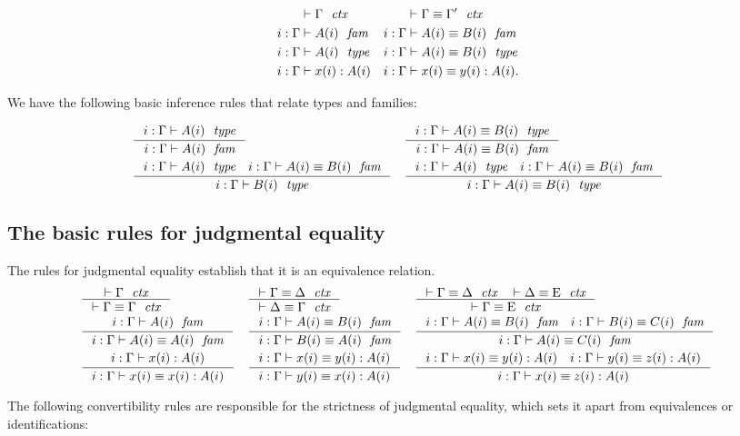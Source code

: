\begin{align*}
\jvctx*{\Gamma} & \jvctxeq*{\Gamma}{\Gamma'}\\
\jvfam*{i}{\Gamma}{A} & \jvfameq*{i}{\Gamma}{A}{B}\\
\jvtype*{i}{\Gamma}{A} & \jvtypeeq*{i}{\Gamma}{A}{B}\\
\jvterm*{i}{\Gamma}{A}{x} & \jvtermeq*{i}{\Gamma}{A}{x}{y}.
\end{align*}

We have the following basic inference rules that relate types and families:

\begin{small}
\begin{align*}
& \inference
  {\jvtype{i}{\Gamma}{A}}
  {\jvfam{i}{\Gamma}{A}}
& & \inference
    {\jvtypeeq{i}{\Gamma}{A}{B}}
    {\jvfameq{i}{\Gamma}{A}{B}}\\
& \inference
  {\jvtype{i}{\Gamma}{A}
   \jvfameq{i}{\Gamma}{A}{B}}
  {\jvtype{i}{\Gamma}{B}}
& & \inference
    {\jvtype{i}{\Gamma}{A}
     \jvfameq{i}{\Gamma}{A}{B}}
    {\jvtypeeq{i}{\Gamma}{A}{B}}
\end{align*}
\end{small}

\subsection{The basic rules for judgmental equality}
The rules for judgmental equality establish that it is an equivalence relation.
\bgroup\small
\begin{align*}
& \inference
  {\jvctx{\Gamma}}
  {\jvctxeq{\Gamma}{\Gamma}} 
& & \inference
    {\jvctxeq{\Gamma}{\Delta}}
    {\jvctxeq{\Delta}{\Gamma}} 
& & \inference
    {\jvctxeq{\Gamma}{\Delta}
     \jvctxeq{\Delta}{\greek{E}}}
    {\jvctxeq{\Gamma}{\greek{E}}}\\
& \inference
  {\jvfam{i}{\Gamma}{A}}
  {\jvfameq{i}{\Gamma}{A}{A}} 
& & \inference
    {\jvfameq{i}{\Gamma}{A}{B}}
    {\jvfameq{i}{\Gamma}{B}{A}}
& & \inference
    {\jvfameq{i}{\Gamma}{A}{B}
     \jvfameq{i}{\Gamma}{B}{C}}
    {\jvfameq{i}{\Gamma}{A}{C}}\\
& \inference
  {\jvterm{i}{\Gamma}{A}{x}}
  {\jvtermeq{i}{\Gamma}{A}{x}{x}}
& & \inference
    {\jvtermeq{i}{\Gamma}{A}{x}{y}}
    {\jvtermeq{i}{\Gamma}{A}{y}{x}}
& & \inference
    {\jvtermeq{i}{\Gamma}{A}{x}{y}
     \jvtermeq{i}{\Gamma}{A}{y}{z}}
    {\jvtermeq{i}{\Gamma}{A}{x}{z}}
\end{align*}
\egroup

The following convertibility rules are responsible for the strictness
of judgmental equality, which sets it apart from equivalences or identifications:

